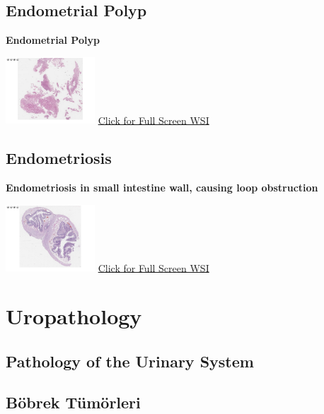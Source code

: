 \documentclass[
  letterpaper,
  paper=6in:9in,
  pagesize=pdftex,
  headinclude=on,
  footinclude=on,
  12pt]{scrbook}
\begin{document}
\hypertarget{sec-endometrial-polyp}{%
\chapter{Endometrial Polyp}\label{sec-endometrial-polyp}}

\textbf{Endometrial Polyp}

\href{https://images.patolojiatlasi.com/endometrial-polyp/HE.html}{\includegraphics[width=0.25\textwidth,height=\textheight]{./screenshots/endometrial-polyp_screenshot.png}}
\href{https://images.patolojiatlasi.com/endometrial-polyp/HE.html}{Click
for Full Screen WSI}

\hypertarget{sec-endometriosis}{%
\chapter{Endometriosis}\label{sec-endometriosis}}

\textbf{Endometriosis in small intestine wall, causing loop obstruction}

\href{https://images.patolojiatlasi.com/endometriosis/HE.html}{\includegraphics[width=0.25\textwidth,height=\textheight]{./screenshots/endometriosis_screenshot.png}}
\href{https://images.patolojiatlasi.com/endometriosis/HE.html}{Click for
Full Screen WSI}

\part{Uropathology}

\hypertarget{sec-urinary-system-pathology}{%
\chapter{Pathology of the Urinary
System}\label{sec-urinary-system-pathology}}

\hypertarget{sec-bobrek-tumorleri}{%
\chapter{Böbrek Tümörleri}\label{sec-bobrek-tumorleri}}
\end{document}
